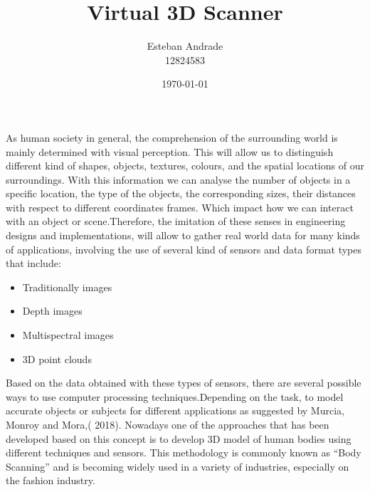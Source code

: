 \documentclass[a4paper]{article}
\title{\Large{\textbf{Virtual 3D Scanner}}}
\author{Esteban Andrade\\ 
12824583}
\date{\today}
\begin{document}
\maketitle


\section*{}
As human society in general, the comprehension of the surrounding world is mainly determined with visual perception.
This will allow us to distinguish different kind of shapes, objects, textures, colours, and the spatial locations of our surroundings.
With this information we can analyse the number of objects in a specific location, the type of the objects, the corresponding sizes, their distances with respect to different coordinates frames.
Which impact how we can interact with an object or scene.Therefore, the imitation of these senses in engineering designs and implementations, will allow to gather real world data for many kinds of applications, involving the use of several kind of sensors and data format types that include: 
 \begin{itemize}
    \itemsep0em 
     \item Traditionally images
     \item Depth images
     \item Multispectral images
     \item 3D point clouds 
 \end{itemize}
 Based on the data obtained with these types of sensors, there are several possible ways to use computer processing techniques.Depending on the task, to model accurate objects or subjects for different applications as suggested by Murcia, Monroy and Mora,( 2018). 
 Nowadays one of the approaches that has been developed based on this concept is to develop 3D model of human bodies using different techniques and sensors.
 This methodology is commonly known as “Body Scanning” and is becoming widely used in a variety of industries, especially on the fashion industry. 
 
\end{document}
